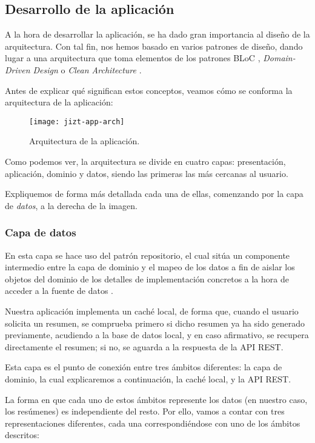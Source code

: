 \subsection{Desarrollo de la aplicación}

A la hora de desarrollar la aplicación, se ha dado gran importancia al diseño de la arquitectura. Con tal fin, nos hemos basado en varios patrones de diseño, dando lugar a una arquitectura que toma elementos de los patrones BLoC \cite{miola20}, \emph{Domain-Driven Design} \cite{vernon13} o \emph{Clean Architecture} \cite{martin15}.

Antes de explicar qué significan estos conceptos, veamos cómo se conforma la arquitectura de la aplicación:

\begin{figure}[!h]
	\centering
	\texttt{[image: jizt-app-arch]}
	\caption{Arquitectura de la aplicación.}
\end{figure}

Como podemos ver, la arquitectura se divide en cuatro capas: presentación, aplicación, dominio y datos, siendo las primeras las más cercanas al usuario.

Expliquemos de forma más detallada cada una de ellas, comenzando por la capa de \emph{datos}, a la derecha de la imagen.

\subsubsection{Capa de datos}

En esta capa se hace uso del patrón repositorio, el cual sitúa un componente intermedio entre la capa de dominio y el mapeo de los datos a fin de aislar los objetos del dominio de los detalles de implementación concretos a la hora de acceder a la fuente de datos \cite{vernon13}.

Nuestra aplicación implementa un caché local, de forma que, cuando el usuario solicita un resumen, se comprueba primero si dicho resumen ya ha sido generado previamente, acudiendo a la base de datos local, y en caso afirmativo, se recupera directamente el resumen; si no, se aguarda a la respuesta de la API REST.

Esta capa es el punto de conexión entre tres ámbitos  diferentes: la capa de dominio, la cual explicaremos a continuación, la caché local, y la API REST.

La forma en que cada uno de estos ámbitos represente los datos (en nuestro caso, los resúmenes) es independiente del resto. Por ello, vamos a contar con tres representaciones diferentes, cada una correspondiéndose con uno de los ámbitos descritos:

